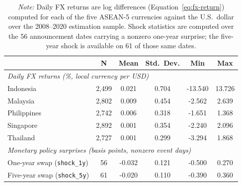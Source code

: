 \begin{table}[H]
\centering
\caption{Descriptive Statistics, 2008--2020 Estimation Sample}
\label{tab:descstats}
\begin{tabular}{lccccc}
\hline
 & N & Mean & Std.\ Dev. & Min & Max \\
\hline
\multicolumn{6}{l}{\textit{Daily FX returns (\%, local currency per USD)}} \\
\quad Indonesia & 2,499 & 0.021 & 0.704 & -13.540 & 13.726 \\
\quad Malaysia & 2,802 & 0.009 & 0.454 & -2.562 & 2.639 \\
\quad Philippines & 2,742 & 0.006 & 0.318 & -1.651 & 1.368 \\
\quad Singapore & 2,892 & 0.001 & 0.354 & -2.240 & 2.096 \\
\quad Thailand & 2,727 & 0.001 & 0.299 & -3.294 & 1.868 \\
\multicolumn{6}{l}{\textit{Monetary policy surprises (basis points, nonzero event days)}} \\
\quad One-year swap (\texttt{shock\_1y}) & 56 & -0.032 & 0.121 & -0.500 & 0.270 \\
\quad Five-year swap (\texttt{shock\_5y}) & 61 & -0.020 & 0.110 & -0.390 & 0.360 \\
\hline
\end{tabular}
\caption*{\footnotesize\textit{Note:} Daily FX returns are log differences (Equation~\ref{eq:fx-return}) computed for each of the five ASEAN-5 currencies against the U.S.\ dollar over the 2008--2020 estimation sample. Shock statistics are computed over the 56 announcement dates carrying a nonzero one-year surprise; the five-year shock is available on 61 of those same dates.}
\end{table}
